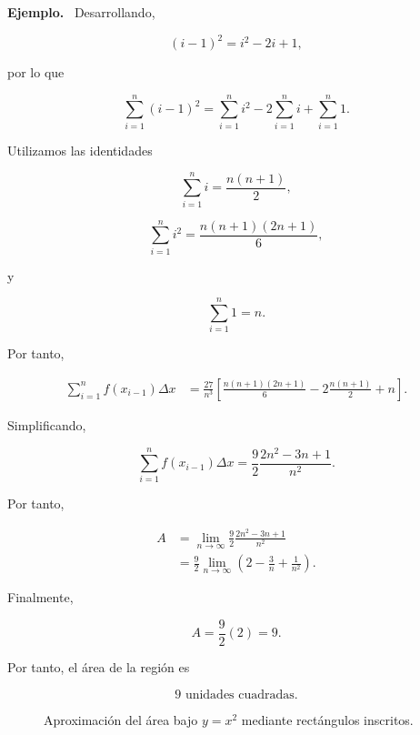 \documentclass[12pt]{article}
\newenvironment{Ejem}
{\par\medskip\noindent\textbf{Ejemplo.}\ }
{\par\medskip}
\begin{document}
\begin{Ejem}
Desarrollando,

\[
(i-1)^2=i^2-2i+1,
\]

por lo que

\[
\sum_{i=1}^{n}(i-1)^2
=
\sum_{i=1}^{n}i^2
-
2\sum_{i=1}^{n}i
+
\sum_{i=1}^{n}1.
\]

Utilizamos las identidades

\[
\sum_{i=1}^{n}i
=
\frac{n(n+1)}{2},
\]

\[
\sum_{i=1}^{n}i^2
=
\frac{n(n+1)(2n+1)}{6},
\]

y

\[
\sum_{i=1}^{n}1=n.
\]

Por tanto,

\begin{align*}
\sum_{i=1}^{n}
f(x_{i-1})\Delta x
&=
\frac{27}{n^3}
\left[
\frac{n(n+1)(2n+1)}{6}
-
2\frac{n(n+1)}{2}
+n
\right].
\end{align*}

Simplificando,

\[
\sum_{i=1}^{n}
f(x_{i-1})\Delta x
=
\frac{9}{2}
\frac{2n^2-3n+1}{n^2}.
\]

Por tanto,

\begin{align*}
A
&=
\lim_{n\to\infty}
\frac{9}{2}
\frac{2n^2-3n+1}{n^2}\\
&=
\frac{9}{2}
\lim_{n\to\infty}
\left(
2-\frac{3}{n}+\frac{1}{n^2}
\right).
\end{align*}

Finalmente,

\[
A
=
\frac{9}{2}(2)
=
\boxed{9}.
\]

Por tanto, el área de la región es

\[
\boxed{9\text{ unidades cuadradas}}.
\]

\begin{figure}[htbp]
\centering


\caption{Aproximación del área bajo $y=x^2$ mediante
rectángulos inscritos.}
\end{figure}
\end{Ejem}
\end{document}
